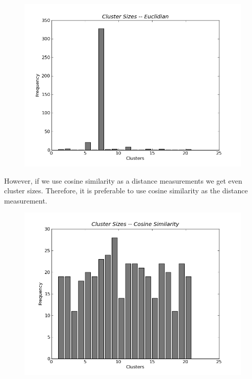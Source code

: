 \begin{figure}[h]
  \includegraphics[width=\linewidth]{./figs/euclidian.png}
  \label{fig:euclidian}
\end{figure}

However, if we use cosine similarity as a distance measurements we get even
cluster sizes. Therefore, it is preferable to use cosine similarity as
the distance measurement.

\begin{figure}[h]
  \includegraphics[width=\linewidth]{./figs/cosine.png}
  \label{fig:cosine}
\end{figure}

